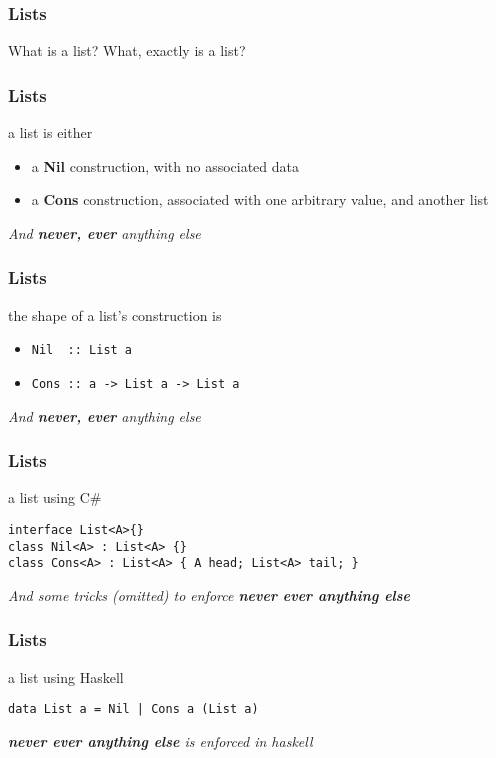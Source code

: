 \begin{frame}
\frametitle{Lists}
\begin{block}{What is a list?}
What, exactly is a list?
\end{block}
\end{frame}

\begin{frame}
\frametitle{Lists}
\begin{block}{a list is either}
\begin{itemize}
\item a \textbf{Nil} construction, with no associated data
\item a \textbf{Cons} construction, associated with one arbitrary value, and another list
\end{itemize}
\end{block}
\emph{And \textbf{never, ever} anything else}
\end{frame}

\begin{frame}
\frametitle{Lists}
\begin{block}{the shape of a list's construction is}
\begin{itemize}
\item \lstinline{Nil  :: List a}
\item \lstinline{Cons :: a -> List a -> List a}
\end{itemize}
\end{block}
\emph{And \textbf{never, ever} anything else}
\end{frame}

\begin{frame}[fragile]
\frametitle{Lists}
\begin{block}{a list using C\#}
\begin{lstlisting}[style=csharp,basicstyle=\scriptsize\ttfamily,mathescape]
interface List<A>{}
class Nil<A> : List<A> {}
class Cons<A> : List<A> { A head; List<A> tail; }
\end{lstlisting}
\end{block}
\tiny{\emph{And some tricks (omitted) to enforce \textbf{never ever anything else}}}
\end{frame}

\begin{frame}[fragile]
\frametitle{Lists}
\begin{block}{a list using Haskell}
\begin{lstlisting}[style=haskell,basicstyle=\scriptsize\ttfamily,mathescape]
data List a = Nil | Cons a (List a)
\end{lstlisting}
\end{block}
\tiny{\emph{\textbf{never ever anything else} is enforced in haskell}}
\end{frame}


